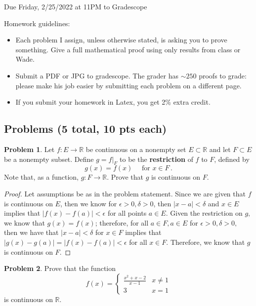 \documentclass[11pt]{article}
\theoremstyle{definition}
\newtheorem{problem}{Problem}
\newcommand{\R}{\mathbb{R}}
\begin{document}
  \hfill Due Friday, 2/25/2022 at 11PM to Gradescope

\bigskip

\noindent Homework guidelines: 
\begin{itemize}
\item Each problem I assign, unless otherwise stated, is asking you to prove something. Give a full mathematical proof using only results from class or Wade.
\item Submit a PDF or JPG to gradescope. The grader has $\sim 250$ proofs to grade:  please make his job easier by submitting each problem on a different page. 
\item If you submit your homework in Latex, you get 2\% extra credit. 
\end{itemize}

\subsection*{Problems (5 total, 10 pts each)}

\begin{problem}
Let $f : E \to \R$ be continuous on a nonempty set $E \subset \R$ and let $F \subset E$ be a nonempty subset. Define $g = f|_F$ to be the {\bf restriction} of $f$ to $F$, defined by 
\[
g(x) = f(x) \quad \text{ for } x \in F \,. 
\]
Note that, as a function, $g : F \to \R$. Prove that $g$ is continuous on $F$. 
\end{problem}

\begin{proof}
Let assumptions be as in the problem statement. Since we are given that $f$ is continuous on $E$, then we know for $\epsilon > 0, \delta > 0$, then $|x-a| < \delta$ and $x\in E$ implies that $|f(x)-f(a)| < \epsilon$ for all points $a\in E.$ Given the restriction on $g,$ we know that $g(x) = f(x)$; therefore, for all $a\in F, a\in E$ for $\epsilon > 0, \delta > 0, $ then we have that $|x-a| < \delta$ for $x\in F$ implies that $|g(x)-g(a)| = |f(x)-f(a)| < \epsilon$ for all $x\in F.$ Therefore, we know that $g$ is continuous on $F.$
\end{proof}

\newpage
\begin{problem}
Prove that the function 
\[
f(x) = \begin{cases} \frac{x^2 + x - 2}{x - 1} & x \neq 1 \\ 3 & x = 1 \end{cases}
\]
is continuous on $\R$. 
\end{problem}
\end{document}

